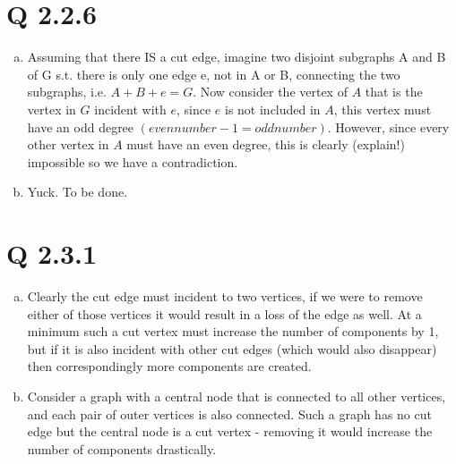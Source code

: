 \section{Q 2.2.6}
\begin{enumerate}[(a)]
\item Assuming that there IS a cut edge, imagine two disjoint subgraphs A and B of G s.t. there is only one edge e, not in A or B, connecting the two subgraphs, i.e. $A+B+e = G$. Now consider the vertex of $A$ that is the vertex in $G$ incident with $e$, since $e$ is not included in $A$, this vertex must have an odd degree $(even number - 1 = odd number)$. However, since every other vertex in $A$ must have an even degree, this is clearly (explain!) impossible so we have a contradiction.

\item Yuck. To be done.

\end{enumerate}

\section{Q 2.3.1}
\begin{enumerate}[(a)]
\item Clearly the cut edge must incident to two vertices, if we were to remove either of those vertices it would result in a loss of the edge as well. At a minimum such a cut vertex must increase the number of components by 1, but if it is also incident with other cut edges (which would also disappear) then correspondingly more components are created.

\item Consider a graph with a central node that is connected to all other vertices, and each pair of outer vertices is also connected. Such a graph has no cut edge but the central node is a cut vertex - removing it would increase the number of components drastically.

\end{enumerate}

